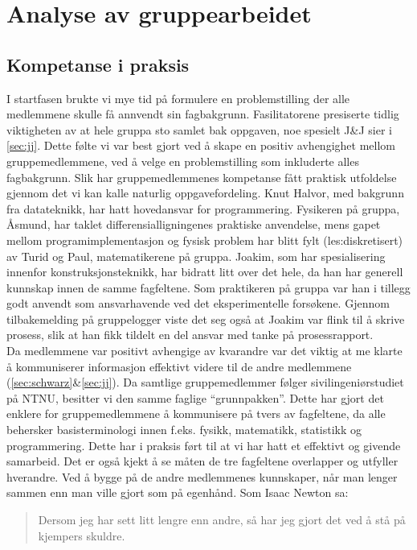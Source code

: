 
\chapter{Analyse av gruppearbeidet}

\section{Kompetanse i praksis}

I startfasen brukte vi mye tid på formulere en problemstilling der alle 
medlemmene skulle få annvendt sin fagbakgrunn. Fasilitatorene presiserte tidlig
viktigheten av at hele gruppa sto samlet bak oppgaven, noe spesielt J\&J sier i
\cref{sec:jj}. Dette følte vi var best gjort ved å skape en positiv avhengighet mellom gruppemedlemmene,
ved å velge en problemstilling som inkluderte alles fagbakgrunn. 
Slik har gruppemedlemmenes kompetanse fått praktisk utfoldelse gjennom det vi
kan kalle naturlig oppgavefordeling. Knut Halvor, med bakgrunn fra
datateknikk, har hatt hovedansvar for programmering.
Fysikeren på gruppa, Åsmund, har taklet differensialligningenes praktiske anvendelse, mens gapet
mellom programimplementasjon og fysisk problem har blitt fylt (les:diskretisert) av Turid og Paul,
matematikerene på gruppa. Joakim, som har spesialisering innenfor konstruksjonsteknikk, har bidratt litt over det hele, da
han har generell kunnskap innen de samme fagfeltene. Som praktikeren på gruppa var han i tillegg godt anvendt 
som ansvarhavende ved det eksperimentelle forsøkene. Gjennom tilbakemelding på
gruppelogger viste det seg også at Joakim var flink til å skrive prosess, slik
at han fikk tildelt en del ansvar med tanke på prosessrapport.\\

Da medlemmene var positivt avhengige av kvarandre var det viktig at me klarte å
kommuniserer informasjon effektivt videre til de andre medlemmene
(\cref{sec:schwarz}\&\ref{sec:jj}).
Da samtlige gruppemedlemmer følger sivilingeniørstudiet på NTNU, besitter vi den samme
faglige ``grunnpakken''. Dette har gjort det enklere for gruppemedlemmene å kommunisere på 
tvers av fagfeltene, da alle behersker basisterminologi innen f.eks. fysikk, matematikk, 
statistikk og programmering. Dette har i praksis ført til at vi har hatt et effektivt
og givende samarbeid. Det er også kjekt å se måten de tre fagfeltene overlapper og
utfyller hverandre. Ved å bygge på de andre medlemmenes kunnskaper, når man
lenger sammen enn man ville gjort som på egenhånd. Som Isaac Newton sa:
\begin{quote}
Dersom jeg har sett litt lengre enn andre, så har jeg gjort det ved å stå på
kjempers skuldre.
\end{quote}

